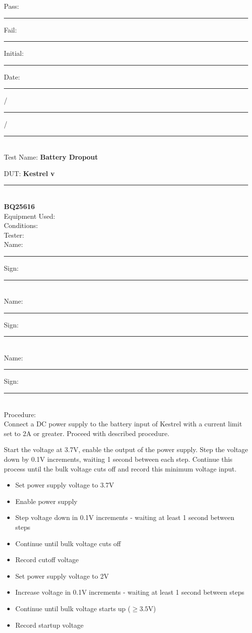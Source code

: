 \vfill
{\large Pass: \rule{1cm}{0.15mm} \hspace{1cm} Fail: \rule{1cm}{0.15mm}} \hfill Initial: \rule{2cm}{0.15mm} \hspace{1cm} Date: \rule{0.5cm}{0.15mm}/\rule{0.5cm}{0.15mm}/\rule{1cm}{0.15mm}\\[5pt]

\pagebreak
{\Huge Test Name: \textbf{Battery Dropout}}\\[20pt]
{\Large DUT: \textbf{Kestrel v}\rule{1cm}{0.15mm}}\\ \textbf{BQ25616} \\[10pt]
{\Large Equipment Used: }\\[40pt]
{\Large Conditions: }\\[40pt]
{\Large Tester: }\\[10pt]
Name: \rule{4cm}{0.15mm} \hfill Sign: \rule{4cm}{0.15mm}\\[5pt]
Name: \rule{4cm}{0.15mm} \hfill Sign: \rule{4cm}{0.15mm}\\[5pt]
Name: \rule{4cm}{0.15mm} \hfill Sign: \rule{4cm}{0.15mm}\\[15pt]
{\Large Procedure: }\\
Connect a DC power supply to the battery input of Kestrel with a current limit set to 2A or greater. Proceed with described procedure. 

Start the voltage at 3.7V, enable the output of the power supply. Step the voltage down by 0.1V increments, waiting 1 second between each step. Continue this process until the bulk voltage cuts off and record this minimum voltage input. 

\begin{itemize}
\item Set power supply voltage to 3.7V
\item Enable power supply
\item Step voltage down in 0.1V increments - waiting at least 1 second between steps
\item Continue until bulk voltage cuts off
\item Record cutoff voltage
\item Set power supply voltage to 2V
\item Increase voltage in 0.1V increments - waiting at least 1 second between steps
\item Continue until bulk voltage starts up ($\geq 3.5 \text{V}$)
\item Record startup voltage
\end{itemize}

